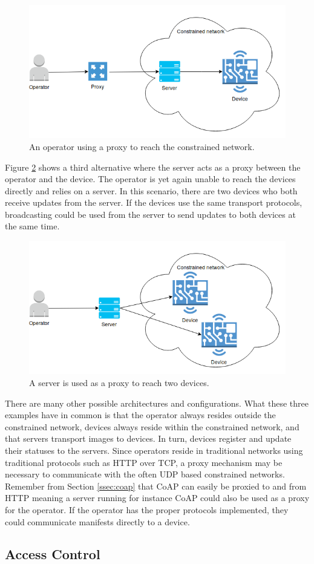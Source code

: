 \documentclass[0-thesis.tex]{subfiles}
\begin{document}
\begin{figure}
    \caption{An operator using a proxy to reach the constrained network.}
    \label{fig:operator-proxy}
    \includegraphics[scale=0.7]{images/operator-proxy.png}
\end{figure}

Figure \ref{fig:operator-server} shows a third alternative where the server acts as a
proxy between the operator and the device. The operator is yet again unable to reach the
devices directly and relies on a server. In this scenario, there are two devices who both
receive updates from the server. If the devices use the same transport protocols,
broadcasting could be used from the server to send updates to both devices at the same
time.

\begin{figure}
    \caption{A server is used as a proxy to reach two devices.}
    \label{fig:operator-server}
    \includegraphics[scale=0.8]{images/operator-server.png}
\end{figure}

There are many other possible architectures and configurations. What these three examples
have in common is that the operator always resides outside the constrained network,
devices always reside within the constrained network, and that servers transport images to
devices. In turn, devices register and update their statuses to the servers. Since
operators reside in traditional networks using traditional protocols such as HTTP over
TCP, a proxy mechanism may be necessary to communicate with the often UDP based
constrained networks. Remember from Section \ref{ssec:coap} that CoAP can easily be
proxied to and from HTTP meaning a server running for instance CoAP could also be used as
a proxy for the operator. If the operator has the proper protocols implemented, they could
communicate manifests directly to a device.

\subsection{Access Control}
\label{ssec:access-control}
\end{document}
